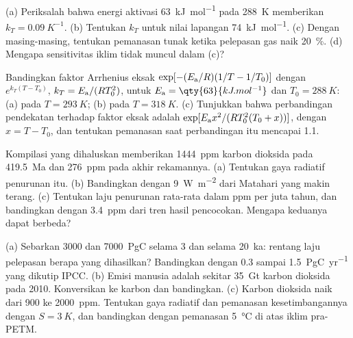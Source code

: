 \begin{exercise}[$\star\star$]\label{exo:b2:deep-time-climate:5}
(a) Periksalah bahwa energi aktivasi \qty{63}{kJ.mol^{-1}} pada \qty{288}{K} memberikan $k_T =
\qty{0.09}{K^{-1}}$. (b) Tentukan $k_T$ untuk nilai lapangan \qty{74}{kJ.mol^{-1}}. (c) Dengan masing-masing, tentukan
pemanasan tunak ketika pelepasan gas naik \qty{20}{\percent}. (d) Mengapa sensitivitas
iklim tidak muncul dalam (c)?
\end{exercise}

\begin{exercise}[$\star\star$]\label{exo:b2:deep-time-climate:6}
Bandingkan faktor Arrhenius eksak $\exp[-(E_{\text a}/R)(1/T - 1/T_0)]$ dengan $e^{k_T(T -
T_0)}$, $k_T = E_{\text a}/(RT_0^2)$, untuk $E_{\text a} = \qty{63}{kJ.mol^{-1}}$ dan $T_0 =
\qty{288}{K}$: (a) pada $T = \qty{293}{K}$; (b) pada $T = \qty{318}{K}$. (c) Tunjukkan bahwa perbandingan
pendekatan terhadap faktor eksak adalah $\exp[E_{\text a}x^2/(RT_0^2(T_0 + x))]$, dengan $x = T - T_0$,
dan tentukan pemanasan saat perbandingan itu mencapai 1.1.
\end{exercise}

\begin{exercise}[$\star\star$]\label{exo:b2:deep-time-climate:7}
Kompilasi yang dihaluskan memberikan \qty{1444}{ppm} karbon dioksida pada \qty{419.5}{Ma} dan
\qty{276}{ppm} pada akhir rekamannya. (a) Tentukan gaya radiatif penurunan itu. (b) Bandingkan dengan
\qty{9}{W.m^{-2}} dari Matahari yang makin terang. (c) Tentukan laju penurunan rata-rata dalam ppm per juta
tahun, dan bandingkan dengan \qty{3.4}{ppm} dari tren hasil pencocokan. Mengapa keduanya dapat berbeda?
\end{exercise}

\begin{exercise}[$\star\star$]\label{exo:b2:deep-time-climate:8}
(a) Sebarkan \num{3000} dan \qty{7000}{PgC} selama 3 dan selama \qty{20}{ka}: rentang laju pelepasan
berapa yang dihasilkan? Bandingkan dengan 0.3 sampai \qty{1.5}{PgC.yr^{-1}} yang dikutip IPCC. (b) Emisi manusia
adalah sekitar \qty{35}{Gt} karbon dioksida pada 2010. Konversikan ke karbon dan bandingkan. (c) Karbon
dioksida naik dari 900 ke \qty{2000}{ppm}. Tentukan gaya radiatif dan pemanasan kesetimbangannya dengan $S =
\qty{3}{K}$, dan bandingkan dengan pemanasan \qty{5}{\celsius} di atas iklim pra-PETM.
\end{exercise}

